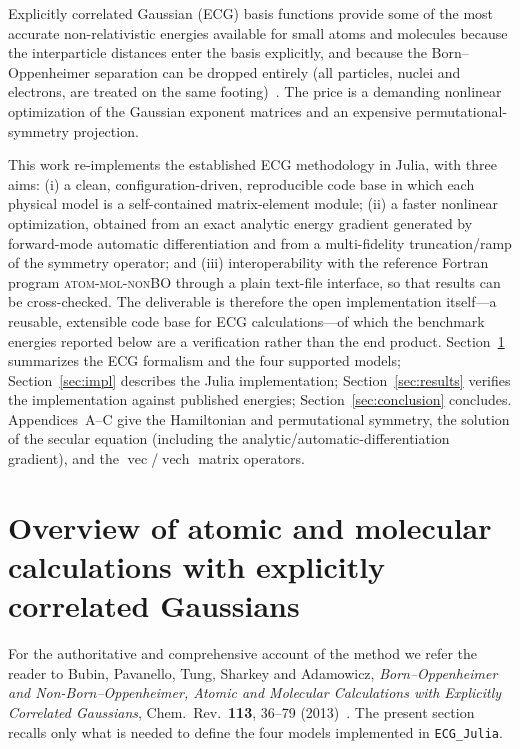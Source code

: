 \documentclass[11pt]{article}
\newcommand{\vech}{\operatorname{vech}}
\newcommand{\vecop}{\operatorname{vec}}
\begin{document}
Explicitly correlated Gaussian (ECG) basis functions provide some of the most
accurate non-relativistic energies available for small atoms and molecules
because the interparticle distances enter the basis explicitly, and because
the Born--Oppenheimer separation can be dropped entirely (all particles,
nuclei and electrons, are treated on the same footing)~\cite{Bubin2013}. The
price is a demanding nonlinear optimization of the Gaussian exponent matrices
and an expensive permutational-symmetry projection.

This work re-implements the established ECG methodology in Julia, with three
aims: (i) a clean, configuration-driven, reproducible code base in which each
physical model is a self-contained matrix-element module; (ii) a faster
nonlinear optimization, obtained from an exact analytic energy gradient
generated by forward-mode automatic differentiation and from a multi-fidelity
truncation/ramp of the symmetry operator; and (iii) interoperability with the
reference Fortran program \textsc{atom-mol-nonBO} through a plain text-file
interface, so that results can be cross-checked. The deliverable is therefore
the open implementation itself---a reusable, extensible code base for ECG
calculations---of which the benchmark energies reported below are a
verification rather than the end product. Section~\ref{sec:overview}
summarizes the ECG formalism and the four supported models; Section~\ref{sec:impl}
describes the Julia implementation; Section~\ref{sec:results} verifies the
implementation against published energies; Section~\ref{sec:conclusion} concludes. Appendices~A--C give
the Hamiltonian and permutational symmetry, the solution of the secular
equation (including the analytic/automatic-differentiation gradient), and the
$\vecop$/$\vech$ matrix operators.

\section{Overview of atomic and molecular calculations with explicitly correlated Gaussians}
\label{sec:overview}

For the authoritative and comprehensive account of the method we refer the
reader to Bubin, Pavanello, Tung, Sharkey and Adamowicz, \emph{Born--Oppenheimer
and Non-Born--Oppenheimer, Atomic and Molecular Calculations with Explicitly
Correlated Gaussians}, Chem.\ Rev.\ \textbf{113}, 36--79
(2013)~\cite{Bubin2013}. The present section recalls only what is needed to
define the four models implemented in \texttt{ECG\_Julia}.
\end{document}
